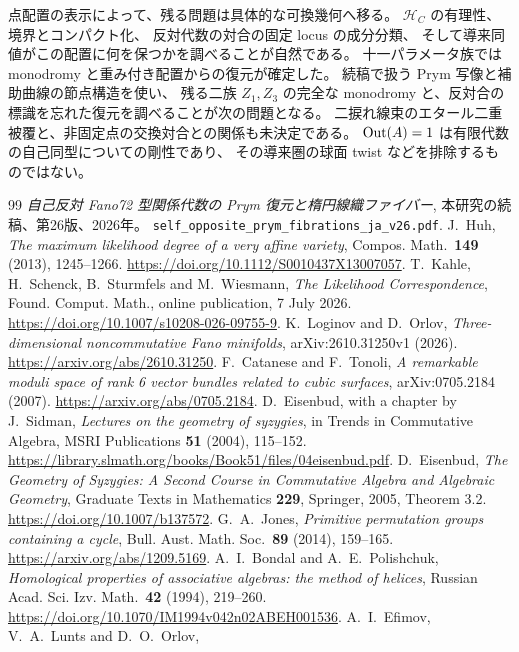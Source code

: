 点配置の表示によって、残る問題は具体的な可換幾何へ移る。
$\mathcal H_C$ の有理性、境界とコンパクト化、
反対代数の対合の固定 locus の成分分類、
そして導来同値がこの配置に何を保つかを調べることが自然である。
十一パラメータ族では monodromy と重み付き配置からの復元が確定した。
続稿\cite{PaperV}で扱う Prym 写像と補助曲線の節点構造を使い、
残る二族 $Z_1,Z_3$ の完全な monodromy と、反対合の標識を忘れた復元を調べることが次の問題となる。
二捩れ線束のエタール二重被覆と、非固定点の交換対合との関係も未決定である。
$\operatorname{Out}(A)=1$ は有限代数の自己同型についての剛性であり、
その導来圏の球面 twist などを排除するものではない。

\clearpage
\begin{thebibliography}{99}
\emph{自己反対 Fano72 型関係代数の Prym 復元と楕円線織ファイバー},
本研究の続稿、第26版、2026年。
\nolinkurl{self_opposite_prym_fibrations_ja_v26.pdf}.
J.~Huh, \emph{The maximum likelihood degree of a very affine variety},
Compos. Math.\ \textbf{149} (2013), 1245--1266.
\url{https://doi.org/10.1112/S0010437X13007057}.
T.~Kahle, H.~Schenck, B.~Sturmfels and M.~Wiesmann,
\emph{The Likelihood Correspondence},
Found. Comput. Math., online publication, 7 July 2026.
\url{https://doi.org/10.1007/s10208-026-09755-9}.
K.~Loginov and D.~Orlov,
\emph{Three-dimensional noncommutative Fano minifolds},
arXiv:2610.31250v1 (2026).
\url{https://arxiv.org/abs/2610.31250}.
F.~Catanese and F.~Tonoli,
\emph{A remarkable moduli space of rank 6 vector bundles related to cubic surfaces},
arXiv:0705.2184 (2007).
\url{https://arxiv.org/abs/0705.2184}.
D.~Eisenbud, with a chapter by J.~Sidman,
\emph{Lectures on the geometry of syzygies},
in Trends in Commutative Algebra, MSRI Publications \textbf{51} (2004), 115--152.
\url{https://library.slmath.org/books/Book51/files/04eisenbud.pdf}.
D.~Eisenbud,
\emph{The Geometry of Syzygies: A Second Course in Commutative Algebra and Algebraic Geometry},
Graduate Texts in Mathematics \textbf{229}, Springer, 2005, Theorem 3.2.
\url{https://doi.org/10.1007/b137572}.
G.~A.~Jones,
\emph{Primitive permutation groups containing a cycle},
Bull. Aust. Math. Soc.\ \textbf{89} (2014), 159--165.
\url{https://arxiv.org/abs/1209.5169}.
A.~I.~Bondal and A.~E.~Polishchuk,
\emph{Homological properties of associative algebras: the method of helices},
Russian Acad. Sci. Izv. Math.\ \textbf{42} (1994), 219--260.
\url{https://doi.org/10.1070/IM1994v042n02ABEH001536}.
A.~I.~Efimov, V.~A.~Lunts and D.~O.~Orlov,

\end{thebibliography}
